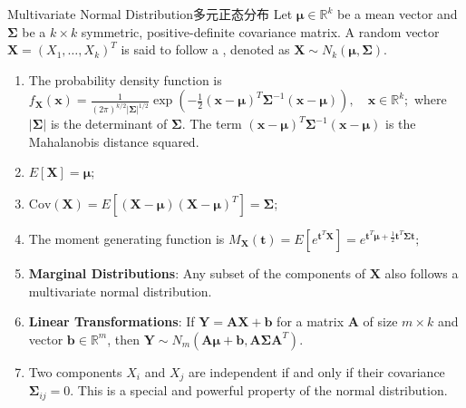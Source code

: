 \documentclass[../main.tex]{subfiles}
\begin{document}
\begin{proposition}{Multivariate Normal Distribution}{多元正态分布}
Let $\boldsymbol{\mu} \in \mathbb{R}^k$ be a mean vector and $\boldsymbol{\Sigma}$ be a $k \times k$ symmetric, positive-definite covariance matrix. A random vector $\mathbf{X} = (X_1, \ldots, X_k)^T$ is said to follow a , denoted as $\mathbf{X} \sim N_k(\boldsymbol{\mu}, \boldsymbol{\Sigma})$.
\begin{enumerate}
\item The probability density function is
$f_{\mathbf{X}}(\mathbf{x}) = \frac{1}{(2\pi)^{k/2} |\boldsymbol{\Sigma}|^{1/2}} \exp\left(-\frac{1}{2}(\mathbf{x}-\boldsymbol{\mu})^T \boldsymbol{\Sigma}^{-1}(\mathbf{x}-\boldsymbol{\mu})\right), \quad \mathbf{x} \in \mathbb{R}^k;$
where $|\boldsymbol{\Sigma}|$ is the determinant of $\boldsymbol{\Sigma}$. The term $(\mathbf{x}-\boldsymbol{\mu})^T \boldsymbol{\Sigma}^{-1}(\mathbf{x}-\boldsymbol{\mu})$ is the Mahalanobis distance squared.
\item $E[\mathbf{X}] = \boldsymbol{\mu}$;
\item $\text{Cov}(\mathbf{X}) = E[(\mathbf{X}-\boldsymbol{\mu})(\mathbf{X}-\boldsymbol{\mu})^T] = \boldsymbol{\Sigma}$;
\item The moment generating function is
$M_{\mathbf{X}}(\mathbf{t}) = E[e^{\mathbf{t}^T\mathbf{X}}] = e^{\mathbf{t}^T\boldsymbol{\mu} + \frac{1}{2}\mathbf{t}^T\boldsymbol{\Sigma}\mathbf{t}};$
\item \textbf{Marginal Distributions}: Any subset of the components of $\mathbf{X}$ also follows a multivariate normal distribution.
\item \textbf{Linear Transformations}: If $\mathbf{Y} = \mathbf{A}\mathbf{X} + \mathbf{b}$ for a matrix $\mathbf{A}$ of size $m \times k$ and vector $\mathbf{b} \in \mathbb{R}^m$, then $\mathbf{Y} \sim N_m(\mathbf{A}\boldsymbol{\mu}+\mathbf{b}, \mathbf{A}\boldsymbol{\Sigma}\mathbf{A}^T)$.
\item Two components $X_i$ and $X_j$ are independent if and only if their covariance $\boldsymbol{\Sigma}_{ij} = 0$. This is a special and powerful property of the normal distribution.
\end{enumerate}
\end{proposition}
\end{document}
